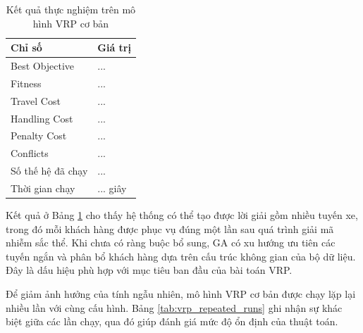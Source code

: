 \documentclass[12pt,a4paper]{article}
\numberwithin{figure}{subsection}
\numberwithin{table}{subsection}
\begin{document}
\begin{table}[htbp]
    \centering
    \caption{Kết quả thực nghiệm trên mô hình VRP cơ bản}
    \label{tab:basic_vrp_result}
    \renewcommand{\arraystretch}{1.28}
    \begin{tabular}{|p{6cm}|p{6cm}|}
        \hline
        \textbf{Chỉ số} & \textbf{Giá trị} \\
        \hline
        Best Objective & ... \\
        \hline
        Fitness & ... \\
        \hline
        Travel Cost & ... \\
        \hline
        Handling Cost & ... \\
        \hline
        Penalty Cost & ... \\
        \hline
        Conflicts & ... \\
        \hline
        Số thế hệ đã chạy & ... \\
        \hline
        Thời gian chạy & ... giây \\
        \hline
    \end{tabular}
\end{table}

Kết quả ở Bảng \ref{tab:basic_vrp_result} cho thấy hệ thống có thể tạo được lời giải gồm nhiều tuyến xe, trong đó mỗi khách hàng được phục vụ đúng một lần sau quá trình giải mã nhiễm sắc thể. Khi chưa có ràng buộc bổ sung, GA có xu hướng ưu tiên các tuyến ngắn và phân bổ khách hàng dựa trên cấu trúc không gian của bộ dữ liệu. Đây là dấu hiệu phù hợp với mục tiêu ban đầu của bài toán VRP.

Để giảm ảnh hưởng của tính ngẫu nhiên, mô hình VRP cơ bản được chạy lặp lại nhiều lần với cùng cấu hình. Bảng \ref{tab:vrp_repeated_runs} ghi nhận sự khác biệt giữa các lần chạy, qua đó giúp đánh giá mức độ ổn định của thuật toán.
\end{document}

